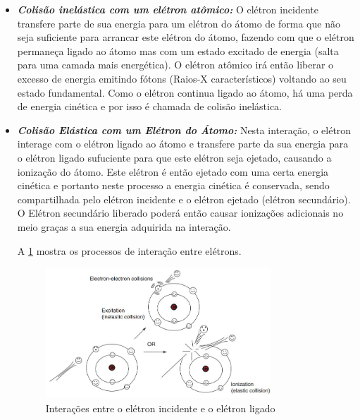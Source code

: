 \documentclass[11pt,a4paper]{article}
\begin{document}
            \begin{itemize}
                \item \textbf{\textit{\textcolor{CarnationPink}{Colisão inelástica com um elétron atômico}:}} O elétron incidente transfere parte de sua energia para um elétron do átomo de forma que não seja suficiente para arrancar este elétron do átomo, fazendo com que o elétron permaneça ligado ao átomo mas com um estado excitado de energia (salta para uma camada mais energética). O elétron atômico irá então liberar o excesso de energia emitindo fótons (Raios-X característicos) voltando ao seu estado fundamental. Como o elétron continua ligado ao átomo, há uma perda de energia cinética e por isso é chamada de colisão inelástica. 
                

                \item \textbf{\textit{\textcolor{CarnationPink}{Colisão Elástica com um Elétron do Átomo}:}} Nesta interação, o elétron interage com o elétron ligado ao átomo e transfere parte da sua energia para o elétron ligado sufuciente para que este elétron seja ejetado, causando a ionização do átomo. Este elétron é então ejetado com uma certa energia cinética e portanto neste processo a energia cinética é conservada, sendo compartilhada pelo elétron incidente e o elétron ejetado (elétron secundário). O Elétron secundário liberado poderá então causar ionizações adicionais no meio graças a sua energia adquirida na interação.
                
                A \ref{fig:interacaoEletronComEletron} mostra os processos de interação entre elétrons. 

                \begin{figure}[h]
                    \centering
                    \includegraphics[width=0.8\textwidth]{Imagens/interacaoEletronComEletron.JPG}
                    \caption{Interações entre o elétron incidente e o elétron ligado}
                    \label{fig:interacaoEletronComEletron}                
                \end{figure}
                



\end{itemize}
\end{document}
